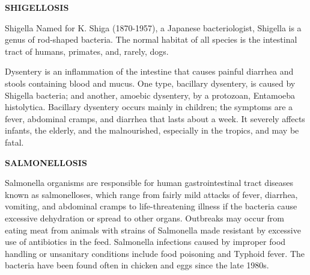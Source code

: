\newpage
{\LARGE \bf SHIGELLOSIS}


Shigella Named for K. Shiga (1870-1957), a Japanese bacteriologist,
Shigella is a genus of rod-shaped bacteria.  The normal habitat of
all species is the intestinal tract of humans, primates, and,
rarely, dogs.

Dysentery is an inflammation of the intestine that causes 
painful diarrhea and stools containing blood and mucus.  One 
type, bacillary dysentery, is caused by Shigella bacteria;  
and another, amoebic dysentery, by a protozoan, Entamoeba 
histolytica.  Bacillary dysentery occurs mainly in children; 
the symptoms are a fever, abdominal cramps, and diarrhea that 
lasts about a week.  It severely affects infants, the elderly, 
and the malnourished, especially in the tropics, and may be 
fatal.  

\newpage
{\LARGE \bf SALMONELLOSIS}

Salmonella organisms are responsible for human gastrointestinal
tract diseases known as salmonelloses, which range from fairly mild
attacks of fever, diarrhea, vomiting, and abdominal cramps to
life-threatening illness if the bacteria cause excessive dehydration
or spread to other organs.  Outbreaks may occur from eating meat
from animals with strains of Salmonella made resistant by excessive
use of antibiotics in the feed.  Salmonella infections caused by
improper food handling or unsanitary conditions include food
poisoning and Typhoid fever.  The bacteria have been found often in
chicken and eggs since the late 1980s.



